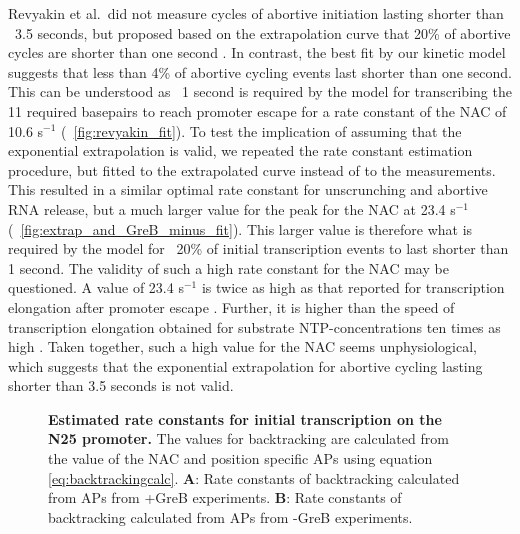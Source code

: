 Revyakin et al.\ did not measure cycles of abortive initiation lasting shorter
than ~3.5 seconds, but proposed based on the extrapolation curve that 20\% of
abortive cycles are shorter than one second \cite{revyakin_abortive_2006}. In
contrast, the best fit by our kinetic model suggests that less than 4\% of
abortive cycling events last shorter than one second. This can be understood
as ~1 second is required by the model for transcribing the 11 required
basepairs to reach promoter escape for a rate constant of the NAC of 10.6
s$^{-1}$ (\FIG~\ref{fig:revyakin_fit}). To test the implication of assuming
that the exponential extrapolation is valid, we repeated the rate constant
estimation procedure, but fitted to the extrapolated curve instead of to the
measurements. This resulted in a similar optimal rate constant for
unscrunching and abortive RNA release, but a much larger value for the peak
for the NAC at 23.4 s$^{-1}$ (\FIG~\ref{fig:extrap_and_GreB_minus_fit}). This
larger value is therefore what is required by the model for ~20\% of initial
transcription events to last shorter than 1 second. The validity of such a
high rate constant for the NAC may be questioned. A value of 23.4 s$^{-1}$ is
twice as high as that reported for transcription elongation after promoter
escape \cite{revyakin_abortive_2006}. Further, it is higher than the speed of
transcription elongation obtained for substrate NTP-concentrations ten times
as high \cite{bai_mechanochemical_2007}. Taken together, such a high value for
the NAC seems unphysiological, which suggests that the exponential
extrapolation for abortive cycling lasting shorter than 3.5 seconds is not
valid.

\begin{figure}[h]
    \caption{ {\bf Estimated rate constants for initial transcription on the N25
      promoter.} The values for backtracking are calculated from the value of
        the NAC and position specific APs using equation
        \eqref{eq:backtrackingcalc}. \textbf{A}: Rate constants of
        backtracking calculated from APs from +GreB experiments. \textbf{B}:
        Rate constants of backtracking calculated from APs from -GreB
        experiments.}
    \label{fig:estimated_parameters}
\end{figure}

